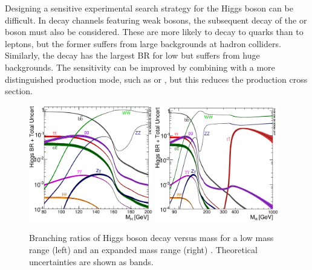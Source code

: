 Designing a sensitive experimental search strategy for the Higgs boson can be difficult. 
In decay channels featuring weak bosons, the subsequent decay of the \PW or \PZ boson must 
also be considered. These are more likely to decay to quarks than to leptons, but the 
former suffers from large backgrounds at hadron colliders. Similarly, the 
\HepProcess{\Pbottom \APbottom} decay has the largest BR for low \mH but suffers from 
huge backgrounds. The sensitivity can be improved by combining with a more distinguished 
production mode, such as \WH or \ZH, but this reduces the production cross section.

\begin{figure}
	\includegraphics[width=0.48\textwidth]{tex/motivation/BR_lowrange}
	\hfill
	\includegraphics[width=0.48\textwidth]{tex/motivation/BR_fullrange}
	\caption{Branching ratios of Higgs boson decay versus mass for a low mass range (left) 
	and an expanded mass range (right) \cite{YR3}. Theoretical uncertainties are shown as 
	bands.}
	\label{fig:higgs_br}
\end{figure}
